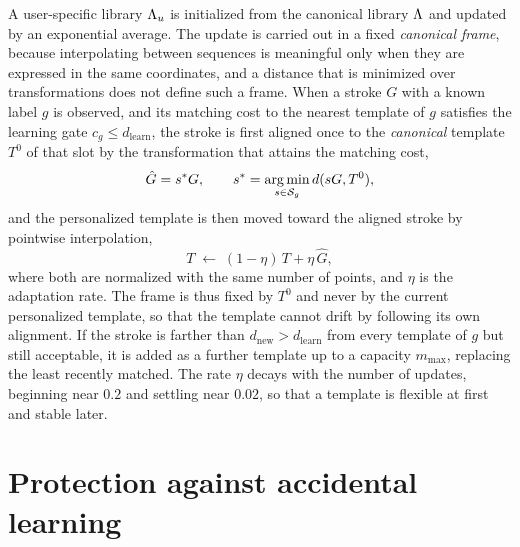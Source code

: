 A user-specific library $\Lambda_u$ is initialized from the canonical library $\Lambda$ and updated by an exponential average. The update is carried out in a fixed \emph{canonical frame}, because interpolating between sequences is meaningful only when they are expressed in the same coordinates, and a distance that is minimized over transformations does not define such a frame. When a stroke $G$ with a known label $g$ is observed, and its matching cost to the nearest template of $g$ satisfies the learning gate $c_g\le d_{\mathrm{learn}}$, the stroke is first aligned once to the \emph{canonical} template $T^0$ of that slot by the transformation that attains the matching cost,
\[
\hat G=s^{\ast}G,\qquad s^{\ast}=\operatorname*{arg\,min}_{s\in\mathcal S_g}d(sG,T^{0}),
\]
and the personalized template is then moved toward the aligned stroke by pointwise interpolation,
\[
T\;\leftarrow\;(1-\eta)\,T+\eta\,\hat G,
\]
where both are normalized with the same number of points, and $\eta$ is the adaptation rate. The frame is thus fixed by $T^0$ and never by the current personalized template, so that the template cannot drift by following its own alignment. If the stroke is farther than $d_{\mathrm{new}}>d_{\mathrm{learn}}$ from every template of $g$ but still acceptable, it is added as a further template up to a capacity $m_{\max}$, replacing the least recently matched. The rate $\eta$ decays with the number of updates, beginning near $0.2$ and settling near $0.02$, so that a template is flexible at first and stable later.\evS

\section{Protection against accidental learning}

